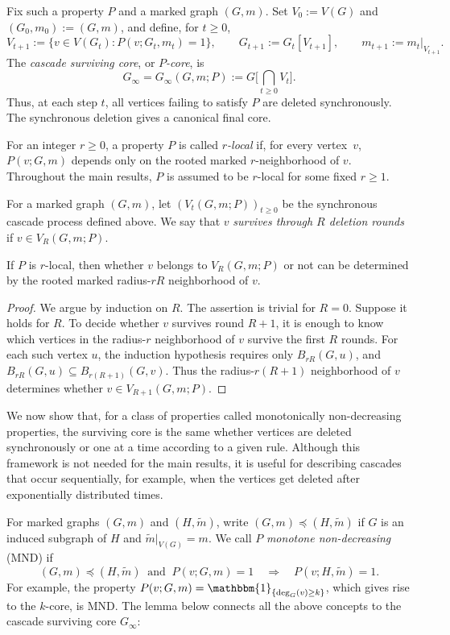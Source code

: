 \documentclass[11pt]{article}
\theoremstyle{plain}
\begin{document}
Fix such a property $P$ and a marked graph $(G,m)$. Set $V_0:=V(G)$ and $(G_0,m_0):=(G,m)$, and define,
for $t\ge0$,
\[
V_{t+1}:=\{v\in V(G_t):P(v;G_t,m_t)=1\},\qquad
G_{t+1}:=G_t[V_{t+1}],\qquad
m_{t+1}:=m_t|_{V_{t+1}}.
\]
The \emph{cascade surviving core}, or \emph{$P$-core}, is
\[
G_{\infty} = G_{\infty}(G,m;P):= G\bigg[\bigcap_{t\ge0}V_t\bigg]. 
\]
Thus, at each step $t$, all vertices failing to satisfy $P$ are deleted synchronously. The synchronous deletion gives a canonical final core.

 For an integer $r\ge0$, a property $P$ is called \emph{$r$-local} if, for every vertex~$v$, $P(v;G,m)$ depends only on the rooted marked $r$-neighborhood of $v$. Throughout the main results, $P$ is assumed to be $r$-local for some fixed $r\ge1$.

For a marked graph $(G,m)$, let $(V_t(G,m;P))_{t\ge0}$ be the synchronous
cascade process defined above. 
We say that $v$ \emph{survives through $R$ deletion rounds} if \(v\in V_R(G,m;P).\)



\begin{lemma}
\label{lem:finite-round-locality}
If $P$ is $r$-local, then whether $v$ belongs to $V_R(G,m;P)$ or not can be determined by the rooted marked radius-$rR$ neighborhood of $v$.
\end{lemma}
\begin{proof}
We argue by induction on $R$. The assertion is trivial for $R=0$. Suppose it
holds for $R$. To decide whether $v$ survives round $R+1$, it is enough to know
which vertices in the radius-$r$ neighborhood of $v$ survive the first $R$
rounds. For each such vertex $u$, the induction hypothesis requires only
$B_{rR}(G,u)$, and $B_{rR}(G,u)\subseteq B_{r(R+1)}(G,v).$
Thus the radius-$r(R+1)$ neighborhood of $v$ determines whether
$v\in V_{R+1}(G,m;P)$.
\end{proof}


We now show that, for a class of properties called monotonically non-decreasing properties, the surviving core is the same whether vertices are deleted synchronously or one at a time according to a given rule. Although this framework is not needed for the main results, it is useful for describing cascades that occur sequentially, for example, when the vertices get deleted after exponentially distributed times.

For marked graphs $(G,m)$ and $(H,\widetilde m)$, write $(G,m)\preceq (H,\widetilde m)$ if $G$ is an induced subgraph of $H$ and $\widetilde m|_{V(G)}=m$. We call $P$ \emph{monotone non-decreasing} (MND) if
\[
(G,m)\preceq (H,\widetilde m)\ \text{ and }\ P(v;G,m)=1
\quad\Longrightarrow\quad
P(v;H,\widetilde m)=1.
\]
For example, the property $P(v;G,m)=\mathbbm{1}_{\{\deg_G(v)\ge k\}}$, which gives rise to the $k$-core, is MND. The lemma below connects all the above concepts to the cascade surviving core $G_{\infty}$: 
\end{document}
